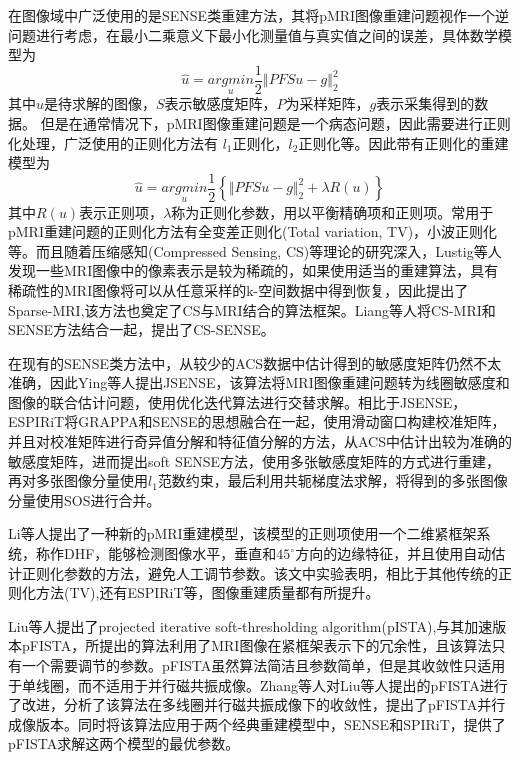 \documentclass[lang=cn,11pt,a4paper,cite=numbers]{elegantpaper}
\begin{document}
\par 在图像域中广泛使用的是SENSE类重建方法，其将pMRI图像重建问题视作一个逆问题进行考虑，在最小二乘意义下最小化测量值与真实值之间的误差，具体数学模型为
\begin{equation}
	\hat{u} = \underset{u}{argmin} \frac{1}{2} \left \Vert  PFSu - g \right\Vert_2^2
\end{equation}
其中$u$是待求解的图像，$S$表示敏感度矩阵，$P$为采样矩阵，$g$表示采集得到的数据。 但是在通常情况下，pMRI图像重建问题是一个病态问题，因此需要进行正则化处理，广泛使用的正则化方法有 $l_1$正则化，$l_2$正则化等。因此带有正则化的重建模型为
\begin{equation}
	\hat{u} = \underset{u}{argmin} \frac{1}{2} \left\{ \Vert  PFSu - g \Vert_2^2  + \lambda R(u) \right \}
\end{equation}
其中$R(u)$表示正则项，$\lambda$称为正则化参数，用以平衡精确项和正则项。常用于pMRI重建问题的正则化方法有全变差正则化(Total variation, TV)\cite{2010Undersampled, 2012Image}，小波正则化\cite{2011A}等。而且随着压缩感知(Compressed Sensing, CS)等理论的研究深入，Lustig等人发现一些MRI图像中的像素表示是较为稀疏的，如果使用适当的重建算法，具有稀疏性的MRI图像将可以从任意采样的k-空间数据中得到恢复，因此提出了Sparse-MRI\cite{lustig2007sparse},该方法也奠定了CS与MRI结合的算法框架。Liang等人将CS-MRI和SENSE方法结合一起，提出了CS-SENSE\cite{liang2009accelerating}。
\par 在现有的SENSE类方法中，从较少的ACS数据中估计得到的敏感度矩阵仍然不太准确，因此Ying等人提出JSENSE\cite{ying2007joint}，该算法将MRI图像重建问题转为线圈敏感度和图像的联合估计问题，使用优化迭代算法进行交替求解。相比于JSENSE，ESPIRiT\cite{uecker2014espirit}将GRAPPA和SENSE的思想融合在一起，使用滑动窗口构建校准矩阵，并且对校准矩阵进行奇异值分解和特征值分解的方法，从ACS中估计出较为准确的敏感度矩阵，进而提出soft SENSE方法，使用多张敏感度矩阵的方式进行重建，再对多张图像分量使用$l_1$范数约束，最后利用共轭梯度法求解，将得到的多张图像分量使用SOS进行合并。
\par Li等人提出了一种新的pMRI重建模型，该模型的正则项使用一个二维紧框架系统，称作DHF\cite{li2016adaptive}，能够检测图像水平，垂直和$45^{\circ}$方向的边缘特征，并且使用自动估计正则化参数的方法，避免人工调节参数。该文中实验表明，相比于其他传统的正则化方法(TV),还有ESPIRiT等，图像重建质量都有所提升。

\par Liu等人提出了projected iterative soft-thresholding algorithm(pISTA),与其加速版本pFISTA\cite{7448403}，所提出的算法利用了MRI图像在紧框架表示下的冗余性，且该算法只有一个需要调节的参数。pFISTA虽然算法简洁且参数简单，但是其收敛性只适用于单线圈，而不适用于并行磁共振成像。Zhang等人对Liu等人提出的pFISTA进行了改进，分析了该算法在多线圈并行磁共振成像下的收敛性，提出了pFISTA并行成像版本\cite{ZHANG2021101987}。同时将该算法应用于两个经典重建模型中，SENSE\cite{pruessmann1999sense}和SPIRiT\cite{lustig2010spirit}，提供了pFISTA求解这两个模型的最优参数。
\end{document}
